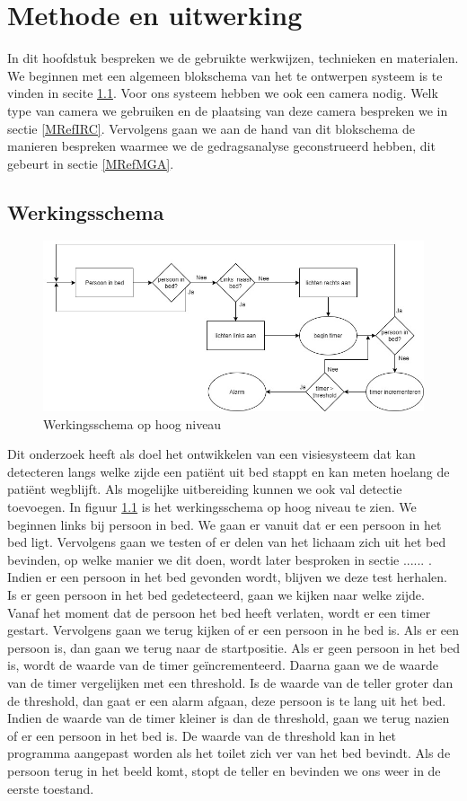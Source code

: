 \chapter{Methode en uitwerking}
\label{mRef}
In dit hoofdstuk bespreken we de gebruikte werkwijzen, technieken en materialen. We beginnen met een algemeen blokschema van het te ontwerpen systeem is te vinden in secite \ref{MRefWeS}. Voor ons systeem hebben we ook een camera nodig. Welk type van camera we gebruiken en de plaatsing van deze camera bespreken we in sectie \ref{MRefIRC}. Vervolgens gaan we aan de hand van dit blokschema de manieren bespreken waarmee we de gedragsanalyse geconstrueerd hebben, dit gebeurt in sectie \ref{MRefMGA}.

\section{Werkingsschema}
\label{MRefWeS}
\begin{figure}[hbp]
	\includegraphics[scale=0.5]{HoogNiveauBlokDiagram}
	\caption{Werkingsschema op hoog niveau}
	\label{imgWeS}
\end{figure}
Dit onderzoek heeft als doel het ontwikkelen van een visiesysteem dat kan detecteren langs welke zijde een pati\"ent uit bed stappt en kan meten hoelang de pati\"ent wegblijft. Als mogelijke uitbereiding kunnen we ook val detectie toevoegen. In figuur \ref{imgWeS} is het werkingsschema op hoog niveau te zien.
We beginnen links bij persoon in bed. We gaan er vanuit dat er een persoon in het bed ligt.  Vervolgens gaan we testen of er delen van het lichaam zich uit het bed bevinden, op welke manier we dit doen, wordt later besproken in sectie ...... . Indien er een persoon in het bed gevonden wordt, blijven we deze test herhalen. Is er geen persoon in het bed gedetecteerd, gaan we kijken naar welke zijde. Vanaf het moment dat de persoon het bed heeft verlaten, wordt er een timer gestart. Vervolgens gaan we terug kijken of er een persoon in he bed is. Als er een persoon is, dan gaan we terug naar de startpositie. Als er geen persoon in het bed is, wordt de waarde van de timer ge\"incrementeerd. Daarna gaan we de waarde van de timer vergelijken met een threshold. Is de waarde van de teller groter dan de threshold, dan gaat er een alarm afgaan, deze persoon is te lang uit het bed. Indien de waarde van de timer kleiner is dan de threshold, gaan we terug nazien of er een persoon in het bed is.  De waarde van de threshold kan in het programma aangepast worden als het toilet zich ver van het bed bevindt.  Als de persoon terug in het beeld komt, stopt de teller en bevinden we ons weer in de eerste toestand.

